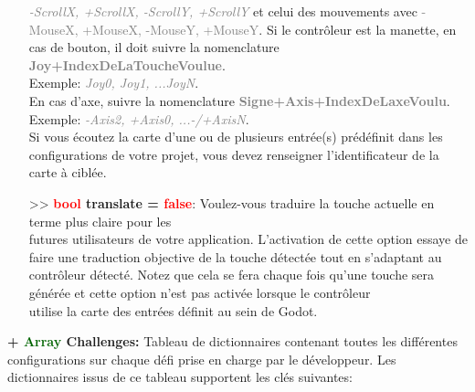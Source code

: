 \documentclass[a4paper, 11pt]{article}
\begin{document}
\begin{itemize}
		\textcolor{gray}{\textit{-ScrollX, +ScrollX, -ScrollY, +ScrollY}} et celui des mouvements avec 
		\textcolor{gray}{-MouseX, +MouseX, -MouseY, +MouseY}. Si le contrôleur est la manette, en cas de 
		bouton, il doit suivre la nomenclature \textcolor{gray}{\textbf{\\Joy+IndexDeLaToucheVoulue}}.\\
		Exemple: \textcolor{gray}{\textit{Joy0, Joy1, ...JoyN}}. \\En cas d'axe, suivre la nomenclature 
		\textcolor{gray}{\textbf{Signe+Axis+IndexDeLaxeVoulu}}. \\Exemple: \textcolor{gray}{\textit{-Axis2, 
		+Axis0, ...-/+AxisN}}. \\Si vous écoutez la carte d'une ou de plusieurs entrée(s) prédéfinit dans 
		les configurations de votre projet, vous devez renseigner l'identificateur de la carte à ciblée.\\
		\item[>> \textbf{\textcolor{red}{bool} translate = \textcolor{red}{false}}:] Voulez-vous traduire la 
		touche actuelle en terme plus claire pour les \\futures utilisateurs de votre application. 
		L'activation de cette option essaye de faire une traduction objective de la touche détectée tout en 
		s'adaptant au contrôleur détecté. Notez que cela se fera chaque fois qu'une touche sera générée et 
		cette option n'est pas activée lorsque le contrôleur \\utilise la carte des entrées définit au sein 
		de Godot.\\
	\end{itemize}
	\textbf{+ \textcolor{darkgreen}{Array} Challenges:} Tableau de dictionnaires contenant toutes les 
	différentes configurations sur chaque défi prise en charge par le développeur. Les dictionnaires issus 
	de ce tableau supportent les clés suivantes:
\end{document}
